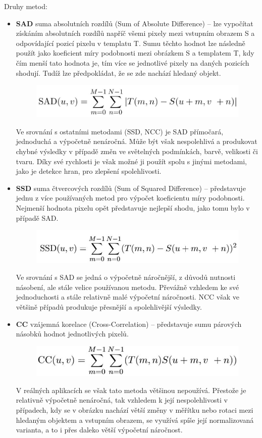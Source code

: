 Druhy metod:
\begin{itemize}
\item \textbf{SAD} suma absolutních rozdílů (Sum of Absolute Difference) --  lze vypočítat získáním absolutních rozdílů napříč všemi pixely mezi vstupním obrazem S a odpovídající pozicí pixelu v templatu T. Sumu těchto hodnot lze následně použít jako koeficient míry podobnosti mezi obrázkem S a templatem T, kdy čím menší tato hodnota je, tím více se jednotlivé pixely na daných pozicích shodují. Tudíž lze předpokládat, že se zde nachází hledaný objekt. 
\begin{figure}[H]
\centering
\includegraphics[width=.6\linewidth]{assets/9_sad}
\end{figure}
Ve srovnání s ostatními metodami (SSD, NCC) je SAD přímočará, jednoduchá a výpočetně nenáročná. Může být však nespolehlivá a produkovat chybné výsledky v případě změn ve světelných podmínkách, barvě, velikosti či tvaru. Díky své rychlosti je však možné ji použít spolu s jinými metodami, jako je detekce hran, pro zlepšení spolehlivosti.
\item \textbf{SSD} suma čtvercových rozdílů (Sum of Squared Difference) --  představuje jednu z více používaných metod pro výpočet koeficientu míry podobnosti. Nejmenší hodnota pixelu opět představuje nejlepší shodu, jako tomu bylo v případě SAD.
\begin{figure}[H]
\centering
\includegraphics[width=.6\linewidth]{assets/9_ssd}
\end{figure}
Ve srovnání s SAD se jedná o výpočetně náročnější, z důvodů nutnosti násobení, ale stále velice používanou metodu. Převážně vzhledem ke své jednoduchosti a stále relativně malé výpočetní náročnosti. NCC však ve většině případů produkuje přesnější a spolehlivější výsledky.
\item \textbf{CC} vzájemná korelace (Cross-Correlation) --  představuje sumu párových násobků hodnot jednotlivých pixelů.
\begin{figure}[H]
\centering
\includegraphics[width=.6\linewidth]{assets/9_cc}
\end{figure}
V reálných aplikacích se však tato metoda většinou nepoužívá. Přestože je relativně výpočetně nenáročná, tak vzhledem k její nespolehlivosti v případech, kdy se v obrázku nachází větší změny v měřítku nebo rotaci mezi hledaným objektem a vstupním obrazem, se využívá spíše její normalizovaná varianta, a to i přes daleko větší výpočetní náročnost.


\end{itemize}

